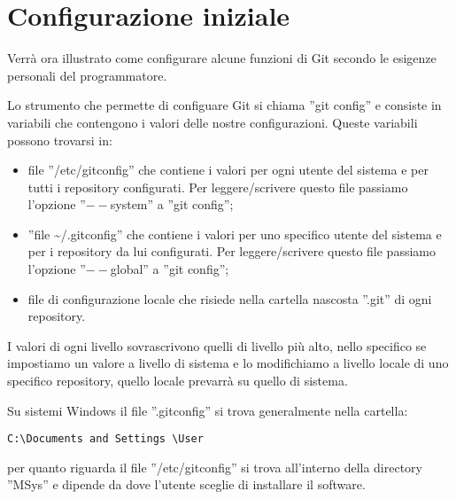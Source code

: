 \section{Configurazione iniziale}
Verrà ora illustrato come configurare alcune funzioni di Git secondo le esigenze personali del programmatore.

Lo strumento che permette di configuare Git si chiama ''git config'' e consiste in variabili che contengono i valori delle nostre configurazioni. Queste variabili possono trovarsi in:

\begin{itemize}
\item file ''/etc/gitconfig'' che contiene i valori per ogni utente del sistema e per tutti i repository configurati. Per leggere/scrivere questo file passiamo l'opzione ''$--$system'' a ''git config'';
\item ''file \textasciitilde /.gitconfig'' che contiene i valori per uno specifico utente del sistema e per i repository da lui configurati. Per leggere/scrivere questo file passiamo l'opzione ''$--$global'' a ''git config'';
\item file di configurazione locale che risiede nella cartella nascosta ''.git'' di ogni repository.
\end{itemize}

I valori di ogni livello sovrascrivono quelli di livello più alto, nello specifico se impostiamo un valore a livello di sistema e lo modifichiamo a livello locale di uno specifico repository, quello locale prevarrà su quello di sistema.

Su sistemi Windows il file ''.gitconfig'' si trova generalmente nella cartella:

\begin{center}
\texttt{C:\textbackslash Documents and Settings \textbackslash User}
\end{center}

per quanto riguarda il file ''/etc/gitconfig'' si trova all'interno della directory ''MSys'' e dipende da dove l'utente sceglie di installare il software.












